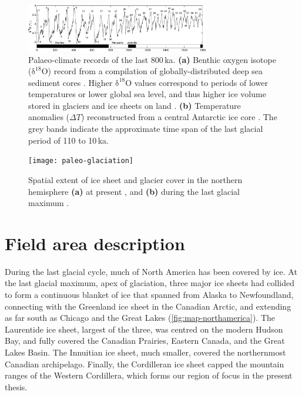 \documentclass{article}
\newcommand{\chem}[1]{\ensuremath{\mathrm{#1}}}
\begin{document}
\begin{figure}
  \centering
  \includegraphics[width=80mm]{paleo-timeseries}
  \caption{Palaeo-climate records of the last 800\,ka.
           \textbf{(a)} Benthic oxygen isotope (\chem{\delta^{18}O}) record
           from a compilation of globally-distributed deep sea sediment cores
           \citep{Lisiecki.Raymo.2005}. Higher \chem{\delta^{18}O} values
           correspond to periods of lower temperatures \citep{Emiliani.1955}
           or lower global sea level, and thus higher ice volume stored in
           glaciers and ice sheets on land \citep{Shackleton.1967}.
           \textbf{(b)} Temperature anomalies ($\Delta T$) reconstructed from a
           central Antarctic ice core \citep[EPICA Dome~C,][]{Jouzel.etal.2007}.
           The grey bands indicate the approximate time span of the last
           glacial period of 110 to 10\,ka.}
  \label{fig:paleo-timeseries}
\end{figure}

\begin{figure}
  \centering
  \texttt{[image: paleo-glaciation]}
  \caption{Spatial extent of ice sheet and glacier cover in the northern
           hemisphere \textbf{(a)} at present \citep{Patterson.Kelso.2014}, and
           \textbf{(b)} during the last glacial maximum
           \citep{Ehlers.Gibbard.2007}.}
  \label{fig:paleo-glaciation}
\end{figure}

\section{Field area description}

During the last glacial cycle, much of North America has been covered by ice.
At the last glacial maximum, apex of glaciation, three major ice sheets had
collided to form a continuous blanket of ice that spanned from Alaska to
Newfoundland, connecting with the Greenland ice sheet in the Canadian Arctic,
and extending as far south as Chicago and the Great Lakes
(\cref{fig:map-northamerica}). The Laurentide ice
sheet, largest of the three, was centred on the modern Hudson Bay,
and fully covered the Canadian Prairies, Eastern Canada, and the Great Lakes
Basin. The Innuitian ice sheet, much smaller, covered the northernmost Canadian
archipelago. Finally, the Cordilleran ice sheet capped the mountain ranges of
the Western Cordillera, which forms our region of focus in the present thesis.
\end{document}
